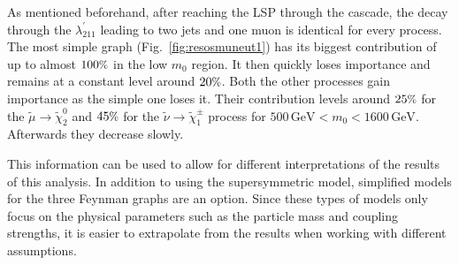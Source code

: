 \noindent As mentioned beforehand, after reaching the LSP through the cascade, the decay through the $\lambda^\prime_{211}$ leading to two jets and one muon is identical for every process. The most simple graph (Fig.~\ref{fig:resosmuneut1}) has its biggest contribution of up to almost $100\pct$ in the low $m_0$ region. It then quickly loses importance and remains at a constant level around $20\pct$. Both the other processes gain importance as the simple one loses it. Their contribution levels around $25\pct$ for the $\tilde{\mu} \rightarrow \tilde{\chi}^0_2$ and $45\pct$ for the $\tilde{\nu} \rightarrow \tilde{\chi}^\pm_1$ process for $500\,\text{GeV} < m_0 < 1600\,\text{GeV}$. Afterwards they decrease slowly.

This information can be used to allow for different interpretations of the results of this analysis. In addition to using the supersymmetric model, simplified models for the three Feynman graphs are an option. Since these types of models only focus on the physical parameters such as the particle mass and coupling strengths, it is easier to extrapolate from the results when working with different assumptions.



